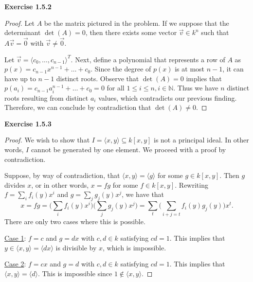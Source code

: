 \documentclass[12pt,oneside]{article}
\newenvironment{exercise}[1]{\vspace{.1in}\noindent\textbf{Exercise #1 \hspace{.05em}}}{}
\newcommand{\N}{\mathbb{N}}
\begin{document}
\begin{exercise}{1.5.2}
    \begin{proof}
        Let $A$ be the matrix pictured in the problem. If we suppose that 
        the determinant $\det(A) = 0$, then there exists some vector $\vec{v} \in k^n$
        such that $A\vec{v} = \vec{0}$ with $\vec{v} \neq \vec{0}$.

        Let $\vec{v} = \langle c_0, \ldots ,c_{n-1} \rangle^T$. Next, define a polynomial
        that represents a row of $A$ as $p(x) = c_{n-1}x^{n-1} + \ldots + c_0$. 
        Since the degree of $p(x)$ is at most $n-1$, it can have up to $n-1$ 
        distinct roots. Observe that $\det(A)=0$ implies that $p(a_i) = c_{n-1}a_i^{n-1}+\ldots+c_0=0$
        for all $1 \leq i \leq n, i \in \N$. Thus we have $n$ distinct roots resulting 
        from distinct $a_i$ values, which contradicts our previous finding. Therefore,
        we can conclude by contradiction that $\det(A) \neq 0$.
    \end{proof}
\end{exercise}


\begin{exercise}{1.5.3}
    \begin{proof}
        We wish to show that $I = \langle x,y \rangle \subseteq k[x,y]$ is not a 
        principal ideal. In other words, $I$ cannot be generated by one element. 
        We proceed with a proof by contradiction.

        Suppose, by way of contradiction, that $\langle x,y \rangle = \langle g \rangle$
        for some $g \in k[x,y]$. Then $g$ divides $x$, or in other words, 
        $x=fg$ for some $f \in k[x,y]$. Rewriting $f = \sum_if_i(y)x^i$ and 
        $g = \sum_jg_j(y)x^j$, we have that 
        \[
            x = fg = \biggr(\sum_if_i(y)x^i\biggr)\biggr(\sum_jg_j(y)x^j\biggr)=\sum_t\biggr(\sum_{i+j=t}f_i(y)g_j(y)\biggr)x^t.
        \]
        There are only two cases where this is possible.

        \underline{Case 1}: $f=c$ and $g=dx$ with $c,d \in k$ satisfying $cd = 1$.
        This implies that $y \in \langle x,y \rangle = \langle dx \rangle$ is divisible by 
        $x$, which is impossible.

        \underline{Case 2}: $f=cx$ and $g=d$ with $c,d \in k$ satisfying $cd = 1$. 
        This implies that $\langle x,y \rangle = \langle d \rangle$. This is impossible 
        since $1 \not \in \langle x,y \rangle$.

    \end{proof}
\end{exercise}
\end{document}
